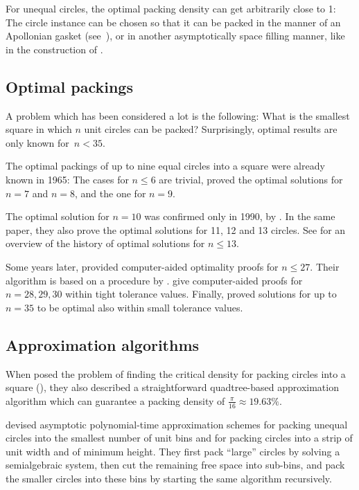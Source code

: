 \documentclass[a4paper,style=print,bibliography=totoc,nexus,lnum,extramargin]{tubsbook}
\begin{document}
For unequal circles, the optimal packing density can get arbitrarily close to 1: The circle instance can be chosen so that it can be packed in the manner of an Apollonian gasket (see~), or in another asymptotically space filling manner, like in the construction of \textcite{bourke2011random}.


\subsection{Optimal packings}

A problem which has been considered a lot is the following: What is the smallest square in which $n$ unit circles can be packed?
Surprisingly, optimal results are only known for~$n < 35$.

The optimal packings of up to nine equal circles into a square were already known in 1965: The cases for $n \le 6$ are trivial,
\textcite{schaer1965densest} proved the optimal solutions for $n = 7$ and $n = 8$, and \textcite{SM1965geometric} the one for $n = 9$.

The optimal solution for $n = 10$ was confirmed only in 1990, by \textcite{DPW1990optimal}. In the same paper, they also prove the optimal solutions for 11, 12 and 13 circles.
See \textcite{WMP1994history} for an overview of the history of optimal solutions for $n \le 13$.

Some years later, \textcite{NO1998more} provided computer-aided optimality proofs for $n \le 27$. Their algorithm is based on a procedure by \textcite{PWMD1992packing}.
\textcite{MC2005new} give computer-aided proofs for $n=28,29,30$ within tight tolerance values.
Finally, \textcite{LR2002packing} proved solutions for up to $n=35$ to be optimal also within small tolerance values.

\subsection{Approximation algorithms}

When \textcite{DFL2010circle} posed the problem of finding the critical density for packing circles into a square (), they also described a straightforward quadtree-based approximation algorithm which can guarantee a packing density of $\frac{\pi}{16} \approx 19.63\%$.

\textcite{MPSSW2014polynomial} devised asymptotic polynomial-time approximation schemes for packing unequal circles into the smallest number of unit bins and for packing circles into a strip of unit width and of minimum height. They first pack “large” circles by solving a semialgebraic system, then cut the remaining free space into sub-bins, and pack the smaller circles into these bins by starting the same algorithm recursively.
\end{document}
